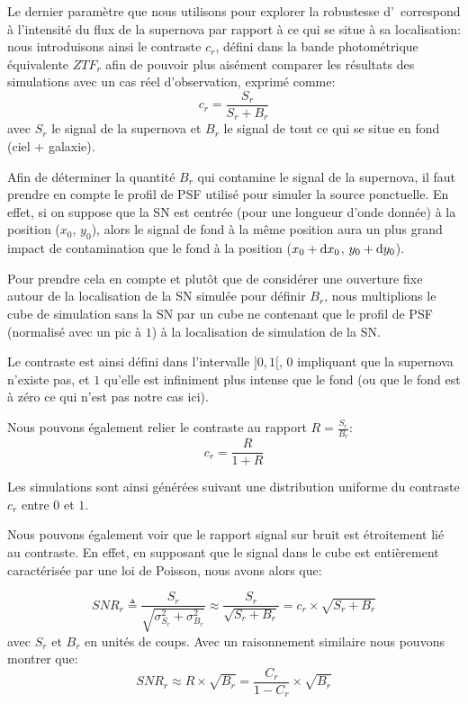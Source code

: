 \documentclass[../main/main.tex]{subfiles}
\begin{document}
Le dernier paramètre que nous utilisons pour explorer la robustesse
d'\hypergal\ correspond à l'intensité du flux de la supernova par
rapport à ce qui se situe à sa localisation: nous introduisons ainsi le
contraste $c_{r}$, défini dans la bande photométrique équivalente $ZTF_{r}$
afin de pouvoir plus aisément comparer les résultats des simulations
avec un cas réel d'observation, exprimé comme:
\begin{equation}
  \label{eq:contrast}
  c_{r} = \frac{S_{r}}{S_{r}+B_{r}}
\end{equation}
avec $S_{r}$ le signal de la supernova et $B_{r}$ le signal de tout ce qui se
situe en fond (ciel + galaxie).

Afin de déterminer la quantité $B_{r}$ qui contamine le signal de la
supernova, il faut prendre en compte le profil de PSF utilisé pour
simuler la source ponctuelle. En effet, si on suppose que la SN est
centrée (pour une longueur d'onde donnée) à la position ($x_{0}$,
$y_{0}$), alors le signal de fond à la même position aura un plus grand
impact de contamination que le fond à la position ($x_{0}+\mathrm{d} x_{0}$,
$y_{0}+\mathrm{d} y_{0}$).

Pour prendre cela en compte et plutôt que de considérer une ouverture fixe
autour de la localisation de la SN simulée pour définir $B_{r}$, nous
multiplions le cube de simulation sans la SN par un cube ne contenant
que le profil de PSF (normalisé avec un pic à $1$) à la localisation de
simulation de la SN.

Le contraste est ainsi défini dans l'intervalle $]0,1[$, $0$ impliquant
que la supernova n'existe pas, et $1$ qu'elle est infiniment plus
intense que le fond (ou que le fond est à zéro ce qui n'est pas notre
cas ici).

Nous pouvons également relier le contraste au rapport $R=\frac{S_{r}}{B_{r}}$:
\begin{equation}
  \label{eq:rapportSB}
  c_{r} = \frac{R}{1+R}
\end{equation}

Les simulations sont ainsi générées suivant une distribution uniforme du
contraste $c_{r}$ entre $0$ et $1$.

Nous pouvons également voir que le rapport signal sur bruit est
étroitement lié au contraste. En effet, en supposant que le signal dans
le cube est
entièrement caractérisée par une loi de Poisson, nous avons alors que:

\begin{equation}
  \label{eq:SNR}
  SNR_{r} \triangleq \frac{S_{r}}{\sqrt{\sigma_{S_{r}}^{2}+\sigma_{B_{r}}^{2}}}\approx
  \frac{S_{r}}{\sqrt{S_{r}+B_{r}}} = c_{r}\times\sqrt{S_{r}+B_{r}}
\end{equation}
avec $S_{r}$ et $B_{r}$ en unités de coups. Avec un raisonnement similaire nous
pouvons montrer que:
\begin{equation}
  \label{eq:logsnr}
  SNR_{r}\approx R\times\sqrt{B_{r}} = \frac{C_{r}}{1-C_{r}}\times\sqrt{B_{r}}
\end{equation} 
\end{document}
